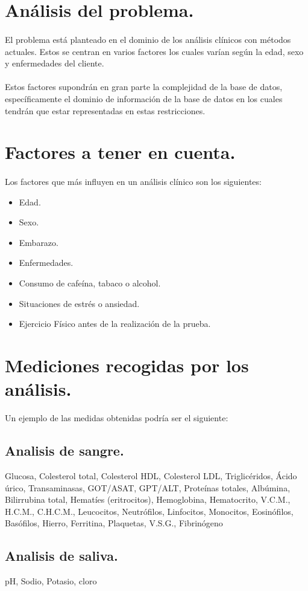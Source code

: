 \documentclass[a4paper,10pt]{article}
\begin{document}
\section{Análisis del problema.}
\paragraph{}
El problema está planteado en el dominio de los análisis clínicos con métodos actuales. Estos se centran en varios factores los cuales varían según la edad, sexo y enfermedades del cliente.
\paragraph{}
Estos factores supondrán en gran parte la complejidad de la base de datos, específicamente el dominio de información de la base de datos en los cuales tendrán que estar representadas en estas restricciones.
\section{Factores a tener en cuenta.}
\label{section:factoresatenerencuenta}
\paragraph{}
Los factores que más influyen en un análisis clínico son los siguientes:
\begin{itemize}
	\item Edad.
	\item Sexo.
	\item Embarazo.
	\item Enfermedades.
	\item Consumo de cafeína, tabaco o alcohol.
	\item Situaciones de estrés o ansiedad.
	\item Ejercicio Físico antes de la realización de la prueba.
\end{itemize}

\section{Mediciones recogidas por los análisis.}
Un ejemplo de las medidas obtenidas podría ser el siguiente:
\subsection{Analisis de sangre.}
Glucosa, Colesterol total, Colesterol HDL, Colesterol LDL, Triglicéridos, Ácido úrico, Transaminasas, GOT/ASAT, GPT/ALT, Proteínas totales, Albúmina, Bilirrubina total, Hematíes (eritrocitos), Hemoglobina, Hematocrito, V.C.M., H.C.M., C.H.C.M., Leucocitos, Neutrófilos, Linfocitos, Monocitos, Eosinófilos, Basófilos, Hierro, Ferritina, Plaquetas, V.S.G., Fibrinógeno \subsection{Analisis de saliva.}
pH, Sodio, Potasio, cloro
\end{document}
